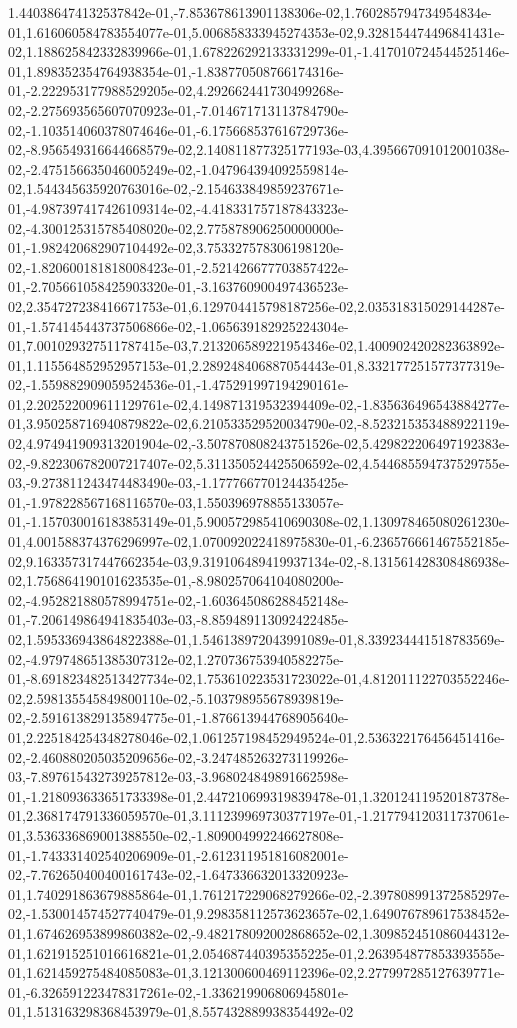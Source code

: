 1.440386474132537842e-01,-7.853678613901138306e-02,1.760285794734954834e-01,1.616060584783554077e-01,5.006858333945274353e-02,9.328154474496841431e-02,1.188625842332839966e-01,1.678226292133331299e-01,-1.417010724544525146e-01,1.898352354764938354e-01,-1.838770508766174316e-01,-2.222953177988529205e-02,4.292662441730499268e-02,-2.275693565607070923e-01,-7.014671713113784790e-02,-1.103514060378074646e-01,-6.175668537616729736e-02,-8.956549316644668579e-02,2.140811877325177193e-03,4.395667091012001038e-02,-2.475156635046005249e-02,-1.047964394092559814e-02,1.544345635920763016e-02,-2.154633849859237671e-01,-4.987397417426109314e-02,-4.418331757187843323e-02,-4.300125315785408020e-02,2.775878906250000000e-01,-1.982420682907104492e-02,3.753327578306198120e-02,-1.820600181818008423e-01,-2.521426677703857422e-01,-2.705661058425903320e-01,-3.163760900497436523e-02,2.354727238416671753e-01,6.129704415798187256e-02,2.035318315029144287e-01,-1.574145443737506866e-02,-1.065639182925224304e-01,7.001029327511787415e-03,7.213206589221954346e-02,1.400902420282363892e-01,1.115564852952957153e-01,2.289248406887054443e-01,8.332177251577377319e-02,-1.559882909059524536e-01,-1.475291997194290161e-01,2.202522009611129761e-02,4.149871319532394409e-02,-1.835636496543884277e-01,3.950258716940879822e-02,6.210533529520034790e-02,-8.523215353488922119e-02,4.974941909313201904e-02,-3.507870808243751526e-02,5.429822206497192383e-02,-9.822306782007217407e-02,5.311350524425506592e-02,4.544685594737529755e-03,-9.273811243474483490e-03,-1.177766770124435425e-01,-1.978228567168116570e-03,1.550396978855133057e-01,-1.157030016183853149e-01,5.900572985410690308e-02,1.130978465080261230e-01,4.001588374376296997e-02,1.070092022418975830e-01,-6.236576661467552185e-02,9.163357317447662354e-03,9.319106489419937134e-02,-8.131561428308486938e-02,1.756864190101623535e-01,-8.980257064104080200e-02,-4.952821880578994751e-02,-1.603645086288452148e-01,-7.206149864941835403e-03,-8.859489113092422485e-02,1.595336943864822388e-01,1.546138972043991089e-01,8.339234441518783569e-02,-4.979748651385307312e-02,1.270736753940582275e-01,-8.691823482513427734e-02,1.753610223531723022e-01,4.812011122703552246e-02,2.598135545849800110e-02,-5.103798955678939819e-02,-2.591613829135894775e-01,-1.876613944768905640e-01,2.225184254348278046e-02,1.061257198452949524e-01,2.536322176456451416e-02,-2.460880205035209656e-02,-3.247485263273119926e-03,-7.897615432739257812e-03,-3.968024849891662598e-01,-1.218093633651733398e-01,2.447210699319839478e-01,1.320124119520187378e-01,2.368174791336059570e-01,3.111239969730377197e-01,-1.217794120311737061e-01,3.536336869001388550e-02,-1.809004992246627808e-01,-1.743331402540206909e-01,-2.612311951816082001e-02,-7.762650400400161743e-02,-1.647336632013320923e-01,1.740291863679885864e-01,1.761217229068279266e-02,-2.397808991372585297e-02,-1.530014574527740479e-01,9.298358112573623657e-02,1.649076789617538452e-01,1.674626953899860382e-02,-9.482178092002868652e-02,1.309852451086044312e-01,1.621915251016616821e-01,2.054687440395355225e-01,2.263954877853393555e-01,1.621459275484085083e-01,3.121300600469112396e-02,2.277997285127639771e-01,-6.326591223478317261e-02,-1.336219906806945801e-01,1.513163298368453979e-01,8.557432889938354492e-02
